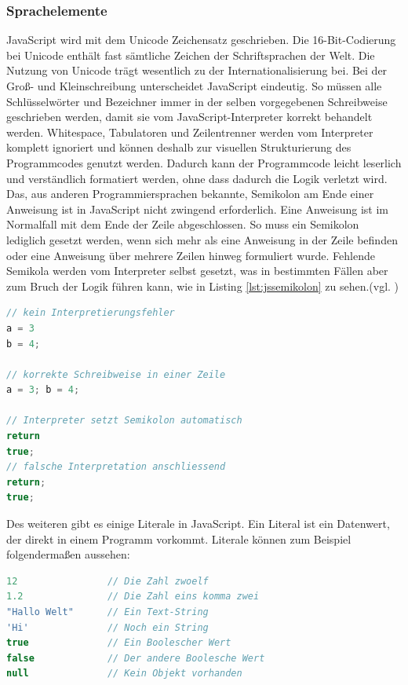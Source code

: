 \subsubsection{Sprachelemente} JavaScript wird mit dem Unicode Zeichensatz geschrieben. Die 16-Bit-Codierung bei Unicode enthält fast sämtliche Zeichen der Schriftsprachen der Welt. Die Nutzung von Unicode trägt wesentlich zu der Internationalisierung bei. Bei der Groß- und Kleinschreibung unterscheidet JavaScript eindeutig. So müssen alle Schlüsselwörter und Bezeichner immer in der selben vorgegebenen Schreibweise geschrieben werden, damit sie vom JavaScript-Interpreter korrekt behandelt werden. Whitespace, Tabulatoren und Zeilentrenner werden vom Interpreter komplett ignoriert und können deshalb zur visuellen Strukturierung des Programmcodes genutzt werden. Dadurch kann der Programmcode leicht leserlich und verständlich formatiert werden, ohne dass dadurch die Logik verletzt wird. Das, aus anderen Programmiersprachen bekannte, Semikolon am Ende einer Anweisung ist in JavaScript nicht zwingend erforderlich. Eine Anweisung ist im Normalfall mit dem Ende der Zeile abgeschlossen. So muss ein Semikolon lediglich gesetzt werden, wenn sich mehr als eine Anweisung in der Zeile befinden oder eine Anweisung über mehrere Zeilen hinweg formuliert wurde. Fehlende Semikola werden vom Interpreter selbst gesetzt, was in bestimmten Fällen aber zum Bruch der Logik führen kann, wie in Listing \ref{lst:jssemikolon} zu sehen.(vgl. \cite[S.15ff]{FlanJava2007})

\vspace{1em}
\begin{lstlisting}[language=JavaScript, caption=JavaScript Logikbruch Semikolon, label=lst:jssemikolon]
// kein Interpretierungsfehler
a = 3
b = 4;

// korrekte Schreibweise in einer Zeile
a = 3; b = 4;

// Interpreter setzt Semikolon automatisch
return
true;
// falsche Interpretation anschliessend
return;
true;
\end{lstlisting}

Des weiteren gibt es einige Literale in JavaScript. \glqq Ein Literal ist ein Datenwert, der direkt in einem Programm vorkommt. Literale können zum Beispiel folgendermaßen aussehen:\grqq{}\cite[S.18]{FlanJava2007}

\vspace{1em}
\begin{lstlisting}[language=JavaScript, caption=JavaScript Literale, label=lst:jsliterale]
12                // Die Zahl zwoelf
1.2               // Die Zahl eins komma zwei
"Hallo Welt"      // Ein Text-String
'Hi'              // Noch ein String
true              // Ein Boolescher Wert
false             // Der andere Boolesche Wert
null              // Kein Objekt vorhanden
\end{lstlisting}
	
